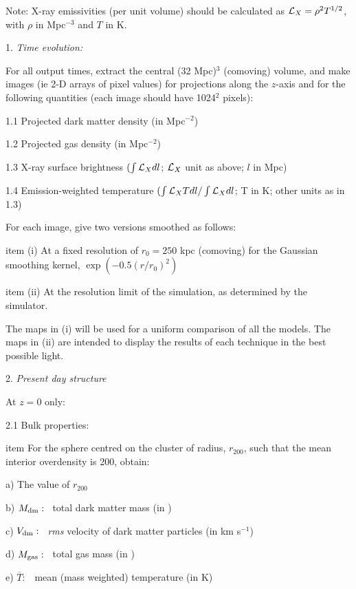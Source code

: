 Note: X-ray emissivities (per unit volume) should be calculated as 
       ${\cal L}_X=\rho^2 T^{1/2}$, with $\rho$ in \Mo Mpc$^{-3}$ and $T$ in K. 

1. {\it Time evolution:} 

For all output times, extract the central (32 Mpc)$^3$ (comoving) volume,
and make images (ie 2-D arrays of pixel values) for projections along the 
$z$-axis and for the following quantities (each image should have 1024$^2$ 
pixels): 

1.1 Projected dark matter density (in \Mo Mpc$^{-2}$) 

1.2 Projected gas density (in \Mo Mpc$^{-2}$)

1.3 X-ray surface brightness $(\int {\cal L}_X dl$; ${\cal L}_X$ unit as
above; $l$ in Mpc)

1.4 Emission-weighted temperature $(\int {\cal L}_X T dl/\int {\cal L}_X
dl$; T in K; other units as in 1.3)

For each image, give two versions smoothed as follows: 

\qquad \2item     (i)  At a fixed resolution of $r_0=250$ kpc (comoving) 
                  for the Gaussian smoothing kernel, $\exp(-0.5(r/r_0)^2)$ 

\qquad \2item 	  (ii) At the resolution limit of the simulation, as
                  determined by the simulator. 

	The maps in (i) will be used for a uniform comparison 
        of all the models. The maps in (ii) are intended 
        to display the results of each technique in the best possible light.

2. {\it Present day structure} 

At $z=0$ only: 

2.1 Bulk properties:
 
\qquad \1item	For the sphere centred on the cluster of radius, $r_{200}$, 
           such that the mean interior overdensity is 200, obtain: 

\qquad        a) The value of $r_{200}$

\qquad        b) $M_{\rm dm}:$ \ total dark matter mass (in \Mo) 

\qquad        c) $V_{\rm dm}:$ \ {\it rms} velocity of dark matter
                 particles (in km s$^{-1}$)

\qquad        d) $M_{\rm gas}:$ \ total gas mass  (in \Mo )

\qquad        e) $\overline T:$  \quad \  mean (mass weighted) temperature 
                  (in K)

